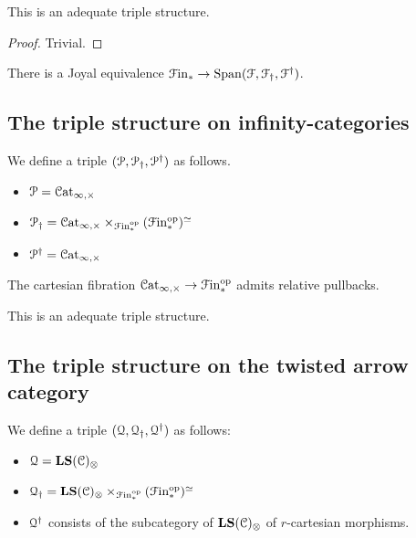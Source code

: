 \documentclass[main.tex]{subfiles}
\begin{document}
\begin{proposition}
  This is an adequate triple structure.
\end{proposition}
\begin{proof}
  Trivial.
\end{proof}

\begin{proposition}
  There is a Joyal equivalence $\mathcal{F}\mathrm{in}_{*} \to \mathrm{Span}(\mathcal{F}, \mathcal{F}_{\dagger}, \mathcal{F}^{\dagger})$.
\end{proposition}

\subsection{The triple structure on infinity-categories}
\label{ssc:the_triple_structure_on_categories}

We define a triple $(\mathcal{P}, \mathcal{P}_{\dagger}, \mathcal{P}^{\dagger})$ as follows.
\begin{itemize}
  \item $\mathcal{P} = \mathcal{C}\mathrm{at}_{\infty,\times}$

  \item $\mathcal{P}_{\dagger} = \mathcal{C}\mathrm{at}_{\infty,\times} \times_{\mathcal{F}\mathrm{in}_{*}^{\mathrm{op}}}(\mathcal{F}\mathrm{in}_{*}^{\mathrm{op}})^{\simeq}$

  \item $\mathcal{P}^{\dagger} = \mathcal{C}\mathrm{at}_{\infty,\times}$
\end{itemize}

\begin{proposition}
  The cartesian fibration $\mathcal{C}\mathrm{at}_{\infty,\times} \to \mathcal{F}\mathrm{in}_{*}^{\mathrm{op}}$ admits relative pullbacks.
\end{proposition}

\begin{proposition}
  This is an adequate triple structure.
\end{proposition}

\subsection{The triple structure on the twisted arrow category}
\label{ssc:the_triple_structure_on_the_twisted_arrow_category}

We define a triple $(\mathcal{Q}, \mathcal{Q}_{\dagger}, \mathcal{Q}^{\dagger})$ as follows:
\begin{itemize}
  \item $\mathcal{Q} = \mathbf{LS}(\mathcal{C})_{\otimes}$

  \item $\mathcal{Q}_{\dagger} = \mathbf{LS}(\mathcal{C})_{\otimes} \times_{\mathcal{F}\mathrm{in}_{*}^{\mathrm{op}}}(\mathcal{F}\mathrm{in}_{*}^{\mathrm{op}})^{\simeq}$

  \item $\mathcal{Q}^{\dagger}$ consists of the subcategory of $\mathbf{LS}(\mathcal{C})_{\otimes}$ of $r$-cartesian morphisms.
\end{itemize}
\end{document}
